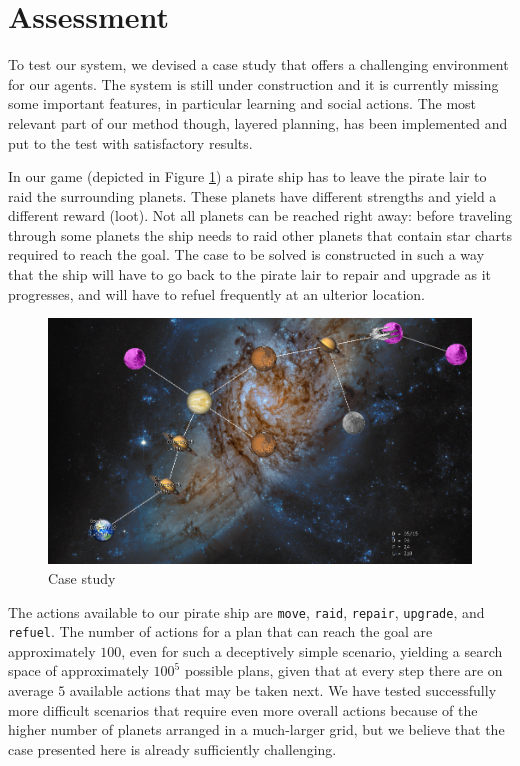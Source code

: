 \section{Assessment}
\label{sec:assessment}

To test our system, we devised a case study that offers a challenging environment for our agents. The system is still under construction and it is currently missing some important features, in particular learning and social actions. The most relevant part of our method though, layered planning, has been implemented and put to the test with satisfactory results.

In our game (depicted in Figure \ref{fig:case-study}) a pirate ship has to leave the pirate lair to raid the surrounding planets. These planets have different strengths and yield a different reward (loot). Not all planets can be reached right away: before traveling through some planets the ship needs to raid other planets that contain star charts required to reach the goal. The case to be solved is constructed in such a way that the ship will have to go back to the pirate lair to repair and upgrade as it progresses, and will have to refuel frequently at an ulterior location.

\begin{figure}
\begin{center}
\includegraphics[scale=0.3]{Pics/Middle.png}
\end{center}
\caption{Case study}
\label{fig:case-study}
\end{figure}  

The actions available to our pirate ship are \texttt{move}, \texttt{raid}, \texttt{repair}, \texttt{upgrade}, and \texttt{refuel}. The number of actions for a plan that can reach the goal are approximately $100$, even for such a deceptively simple scenario, yielding a search space of approximately $100^5$ possible plans, given that at every step there are on average $5$ available actions that may be taken next. We have tested successfully more difficult scenarios that require even more overall actions because of the higher number of planets arranged in a much-larger grid, but we believe that the case presented here is already sufficiently challenging.

